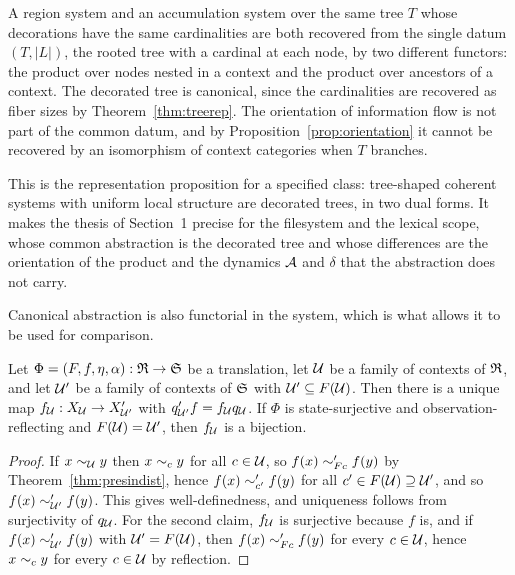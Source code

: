 \begin{corollary}\label{cor:commonfsscope}
A region system and an accumulation system over the same tree $T$ whose decorations have the same cardinalities are both recovered from the single datum $(T,|L|)$, the rooted tree with a cardinal at each node, by two different functors: the product over nodes nested in a context and the product over ancestors of a context. The decorated tree is canonical, since the cardinalities are recovered as fiber sizes by Theorem~\ref{thm:treerep}. The orientation of information flow is not part of the common datum, and by Proposition~\ref{prop:orientation} it cannot be recovered by an isomorphism of context categories when $T$ branches.
\end{corollary}

This is the representation proposition for a specified class: tree-shaped coherent systems with uniform local structure are decorated trees, in two dual forms. It makes the thesis of Section~1 precise for the filesystem and the lexical scope, whose common abstraction is the decorated tree and whose differences are the orientation of the product and the dynamics $\mathcal A$ and $\delta$ that the abstraction does not carry.

Canonical abstraction is also functorial in the system, which is what allows it to be used for comparison.

\begin{proposition}\label{prop:functorial}
Let $\Phi=(F,f,\eta,\alpha):\mathfrak R\to\mathfrak S$ be a translation, let $\mathcal U$ be a family of contexts of $\mathfrak R$, and let $\mathcal U'$ be a family of contexts of $\mathfrak S$ with $\mathcal U'\subseteq F(\mathcal U)$. Then there is a unique map $f_{\mathcal U}:X_{\mathcal U}\to X'_{\mathcal U'}$ with $q'_{\mathcal U'}f=f_{\mathcal U}q_{\mathcal U}$. If $\Phi$ is state-surjective and observation-reflecting and $F(\mathcal U)=\mathcal U'$, then $f_{\mathcal U}$ is a bijection.
\end{proposition}
\begin{proof}
If $x\sim_{\mathcal U}y$ then $x\sim_cy$ for all $c\in\mathcal U$, so $f(x)\sim'_{Fc}f(y)$ by Theorem~\ref{thm:presindist}, hence $f(x)\sim'_{c'}f(y)$ for all $c'\in F(\mathcal U)\supseteq\mathcal U'$, and so $f(x)\sim'_{\mathcal U'}f(y)$. This gives well-definedness, and uniqueness follows from surjectivity of $q_\mathcal U$. For the second claim, $f_\mathcal U$ is surjective because $f$ is, and if $f(x)\sim'_{\mathcal U'}f(y)$ with $\mathcal U'=F(\mathcal U)$, then $f(x)\sim'_{Fc}f(y)$ for every $c\in\mathcal U$, hence $x\sim_cy$ for every $c\in\mathcal U$ by reflection.
\end{proof}

